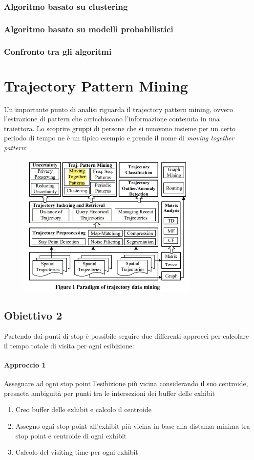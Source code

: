 \documentclass[12pt]{article}
\begin{document}
\subsubsection{Algoritmo basato su clustering}
\subsubsection{Algoritmo basato su modelli probabilistici}
\subsubsection{Confronto tra gli algoritmi}
\newpage
\section{Trajectory Pattern Mining}
Un importante punto di analisi riguarda il trajectory pattern mining, ovvero l'estrazione di pattern che arricchiscano l'informazione contenuta in una traiettora. Lo scoprire gruppi di persone che si muovono insieme per un certo periodo di tempo ne è un tipico esempio e prende il nome di \textit{moving together pattern}:
\begin{figure}[htb!]
    \centering
    \includegraphics[width=0.8\textwidth]{images/mtp.jpg}
\end{figure}
\FloatBarrier
\subsection{Obiettivo 2}
Partendo dai punti di stop è possibile seguire due differenti approcci per calcolare il tempo totale di visita per ogni esibizione:
\paragraph{Approccio 1} Assegnare ad ogni stop point l'esibizione più vicina considerando il suo centroide, presneta ambiguità per punti tra le intersezioni dei buffer delle exhibit
\begin{enumerate}
    \item Creo buffer delle exhibit e calcolo il centroide
    \item Assegno ogni stop point all'exhibit più vicina in base alla distanza minima tra stop point e centroide di ogni exhibit
    \item Calcolo del visiting time per ogni exhibit
\end{enumerate}
\end{document}
